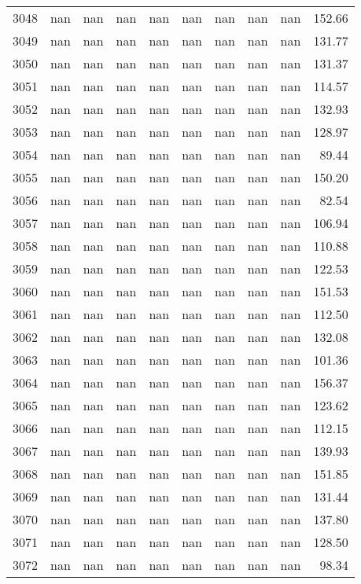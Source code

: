 \begin{tabular}{lrrrrrrrrr}
3048 & nan & nan & nan & nan & nan & nan & nan & nan & 152.66 \\
3049 & nan & nan & nan & nan & nan & nan & nan & nan & 131.77 \\
3050 & nan & nan & nan & nan & nan & nan & nan & nan & 131.37 \\
3051 & nan & nan & nan & nan & nan & nan & nan & nan & 114.57 \\
3052 & nan & nan & nan & nan & nan & nan & nan & nan & 132.93 \\
3053 & nan & nan & nan & nan & nan & nan & nan & nan & 128.97 \\
3054 & nan & nan & nan & nan & nan & nan & nan & nan & 89.44 \\
3055 & nan & nan & nan & nan & nan & nan & nan & nan & 150.20 \\
3056 & nan & nan & nan & nan & nan & nan & nan & nan & 82.54 \\
3057 & nan & nan & nan & nan & nan & nan & nan & nan & 106.94 \\
3058 & nan & nan & nan & nan & nan & nan & nan & nan & 110.88 \\
3059 & nan & nan & nan & nan & nan & nan & nan & nan & 122.53 \\
3060 & nan & nan & nan & nan & nan & nan & nan & nan & 151.53 \\
3061 & nan & nan & nan & nan & nan & nan & nan & nan & 112.50 \\
3062 & nan & nan & nan & nan & nan & nan & nan & nan & 132.08 \\
3063 & nan & nan & nan & nan & nan & nan & nan & nan & 101.36 \\
3064 & nan & nan & nan & nan & nan & nan & nan & nan & 156.37 \\
3065 & nan & nan & nan & nan & nan & nan & nan & nan & 123.62 \\
3066 & nan & nan & nan & nan & nan & nan & nan & nan & 112.15 \\
3067 & nan & nan & nan & nan & nan & nan & nan & nan & 139.93 \\
3068 & nan & nan & nan & nan & nan & nan & nan & nan & 151.85 \\
3069 & nan & nan & nan & nan & nan & nan & nan & nan & 131.44 \\
3070 & nan & nan & nan & nan & nan & nan & nan & nan & 137.80 \\
3071 & nan & nan & nan & nan & nan & nan & nan & nan & 128.50 \\
3072 & nan & nan & nan & nan & nan & nan & nan & nan & 98.34 \\

\end{tabular}
